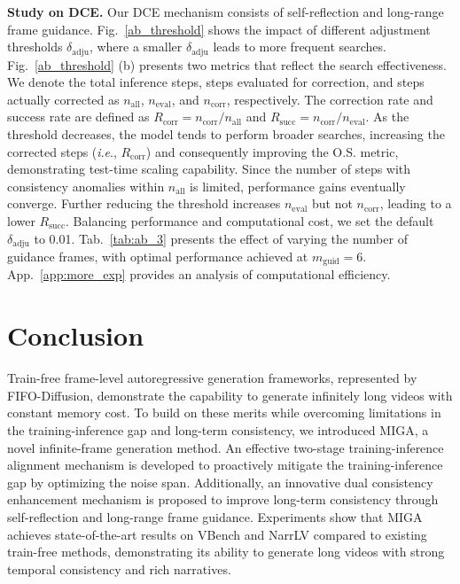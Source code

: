 \documentclass{article}
\theoremstyle{plain}
\theoremstyle{definition}
\theoremstyle{remark}
\newcommand{\ie}{\textit{i}.\textit{e}.}
\begin{document}
\textbf{Study on DCE.}
Our DCE mechanism consists of self-reflection and long-range frame guidance. 
Fig.~\ref{ab_threshold} shows the impact of different adjustment thresholds $\delta_{\mathrm{adju}}$, where a smaller $\delta_{\mathrm{adju}}$ leads to more frequent searches. 
Fig.~\ref{ab_threshold} (b) presents two metrics that reflect the search effectiveness. We denote the total inference steps, steps evaluated for correction, and steps actually corrected as $n_{\mathrm{all}}$, $n_{\mathrm{eval}}$, and $n_{\mathrm{corr}}$, respectively. The correction rate and success rate are defined as $R_{\mathrm{corr}} = n_{\mathrm{corr}} / n_{\mathrm{all}}$ and $R_{\mathrm{succ}} = n_{\mathrm{corr}} / n_{\mathrm{eval}}$.
As the threshold decreases, the model tends to perform broader searches, increasing the corrected steps (\ie, $R_{\mathrm{corr}}$) and consequently improving the O.S. metric, demonstrating test-time scaling capability.
Since the number of steps with consistency anomalies within $n_{\mathrm{all}}$ is limited, performance gains eventually converge. Further reducing the threshold increases $n_{\mathrm{eval}}$ but not $n_{\mathrm{corr}}$, leading to a lower $R_{\mathrm{succ}}$.
Balancing performance and computational cost, we set the default $\delta_{\mathrm{adju}}$ to 0.01.
Tab.~\ref{tab:ab_3} presents the effect of varying the number of guidance frames, with optimal performance achieved at $m_{\mathrm{guid}}=6$.
App.~\ref{app:more_exp} provides an analysis of computational efficiency.

\section{Conclusion}
Train-free frame-level autoregressive generation frameworks, represented by FIFO-Diffusion, demonstrate the capability to generate infinitely long videos with constant memory cost.
To build on these merits while overcoming limitations in the training-inference gap and long-term consistency, we introduced MIGA, a novel infinite-frame generation method. 
An effective two-stage training-inference alignment mechanism is developed to proactively mitigate the training-inference gap by optimizing the noise span. 
Additionally, an innovative dual consistency enhancement mechanism is proposed to improve long-term consistency through self-reflection and long-range frame guidance.
Experiments show that MIGA achieves state-of-the-art results on VBench and NarrLV compared to existing train-free methods, demonstrating its ability to generate long videos with strong temporal consistency and rich narratives.
\end{document}

